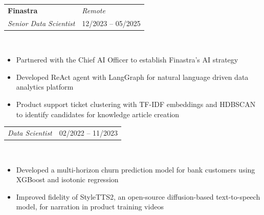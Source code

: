 \documentclass{article}
\begin{document}
\begin{tabular}{p{4.8in}p{2in}}
    \bf{Finastra}  &  \emph{Remote} \\
    \emph{Senior Data Scientist} & 12/2023 -- 05/2025
\end{tabular}
\vspace{-0.2in}
\begin{minipage}{0.03\textwidth}
~\\
\end{minipage}
\begin{minipage}{0.7\textwidth}
\begin{itemize}[label=\raisebox{0.25ex}{\tiny$\bullet$}]
    \item Partnered with the Chief AI Officer to establish Finastra’s AI strategy
    \item Developed ReAct agent with LangGraph for natural language driven data analytics platform
    \item Product support ticket clustering with TF-IDF embeddings and HDBSCAN to identify candidates for knowledge article creation
\end{itemize}
\end{minipage}

\vspace{0.65cm}

\begin{tabular}{p{4.8in}p{2in}}
    \emph{Data Scientist} & 02/2022 -- 11/2023
\end{tabular}
\vspace{-0.2in}
\begin{minipage}{0.03\textwidth}
~\\
\end{minipage}
\begin{minipage}{0.7\textwidth}
\begin{itemize}[label=\raisebox{0.25ex}{\tiny$\bullet$}]
    \item Developed a multi-horizon churn prediction model for bank customers using XGBoost and isotonic regression
    \item Improved fidelity of StyleTTS2, an open-source diffusion-based text-to-speech model, for narration in product training videos
\end{itemize}
\end{minipage}

\vspace{1cm}
\end{document}
